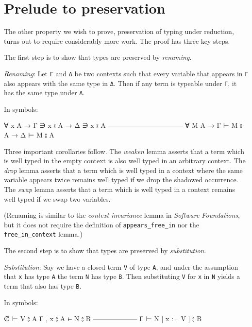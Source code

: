\hypertarget{prelude-to-preservation}{%
\section{Prelude to preservation}\label{prelude-to-preservation}}

The other property we wish to prove, preservation of typing under
reduction, turns out to require considerably more work. The proof has
three key steps.

The first step is to show that types are preserved by \emph{renaming}.

\emph{Renaming}: Let \texttt{Γ} and \texttt{Δ} be two contexts such that
every variable that appears in \texttt{Γ} also appears with the same
type in \texttt{Δ}. Then if any term is typeable under \texttt{Γ}, it
has the same type under \texttt{Δ}.

In symbols:

\begin{myDisplay}
∀ {x A} → Γ ∋ x ⦂ A  →  Δ ∋ x ⦂ A
---------------------------------
∀ {M A} → Γ ⊢ M ⦂ A  →  Δ ⊢ M ⦂ A
\end{myDisplay}

Three important corollaries follow. The \emph{weaken} lemma asserts that
a term which is well typed in the empty context is also well typed in an
arbitrary context. The \emph{drop} lemma asserts that a term which is
well typed in a context where the same variable appears twice remains
well typed if we drop the shadowed occurrence. The \emph{swap} lemma
asserts that a term which is well typed in a context remains well typed
if we swap two variables.

(Renaming is similar to the \emph{context invariance} lemma in
\emph{Software Foundations}, but it does not require the definition of
\texttt{appears\_free\_in} nor the \texttt{free\_in\_context} lemma.)

The second step is to show that types are preserved by
\emph{substitution}.

\emph{Substitution}: Say we have a closed term \texttt{V} of type
\texttt{A}, and under the assumption that \texttt{x} has type \texttt{A}
the term \texttt{N} has type \texttt{B}. Then substituting \texttt{V}
for \texttt{x} in \texttt{N} yields a term that also has type
\texttt{B}.

In symbols:

\begin{myDisplay}
∅ ⊢ V ⦂ A
Γ , x ⦂ A ⊢ N ⦂ B
--------------------
Γ ⊢ N [ x := V ] ⦂ B
\end{myDisplay}

